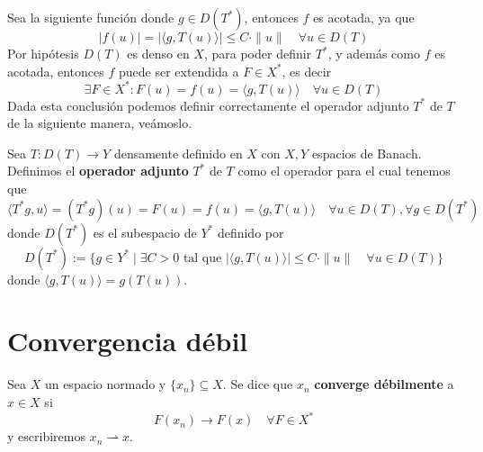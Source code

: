 \documentclass[12pt]{book}
\begin{document}
\noindent
Sea la siguiente función
donde $g \in D(T^*)$, entonces $f$ es acotada, ya que 
\begin{equation*}
    |f(u)| = |\langle g, T(u) \rangle| \le C \cdot \|u\| \quad \forall u \in D(T)
\end{equation*}
Por hipótesis $D(T)$ es denso en $X$, para poder definir $T^*$, y además como $f$ es acotada, entonces $f$ puede ser extendida a $F \in X^*$, es decir
\begin{equation*}
    \exists F \in X^* : F(u) = f(u) = \langle g, T(u) \rangle \quad \forall u \in D(T)
\end{equation*}
Dada esta conclusión podemos definir correctamente el operador adjunto $T^*$ de $T$ de la siguiente manera, veámoslo. \\

\begin{definicion}
    Sea $T: D(T) \longrightarrow Y$ densamente definido en $X$ con $X, Y$ espacios de Banach. Definimos el \textbf{operador adjunto} $T^*$ de $T$ como el operador
    para el cual tenemos que 
    \begin{equation*}
        \langle T^*g, u \rangle = (T^*g)(u) = F(u) = f(u) = \langle g, T(u) \rangle \quad \forall u \in D(T), \forall g \in D(T^*) 
    \end{equation*}
    donde $D(T^*)$ es el subespacio de $Y^*$ definido por
    \begin{equation*}
        D(T^*):= \{ g \in Y^* \mid \exists C > 0 \text{ tal que } |\langle g, T(u) \rangle| \le C \cdot \|u\| \quad \forall u \in D(T) \}
    \end{equation*}
    donde $\langle g, T(u) \rangle = g(T(u))$. \\
\end{definicion}

\chapter{Convergencia débil}
\begin{definicion}
    Sea $X$ un espacio normado y $\{x_n\} \subseteq X$. Se dice que $x_n$ \textbf{converge débilmente} a $x \in X$ si
    \begin{equation*}
        F(x_n) \longrightarrow F(x) \quad \forall F \in X^*
    \end{equation*}
    y escribiremos $x_n \rightharpoonup x$. \\
\end{definicion}
\end{document}
